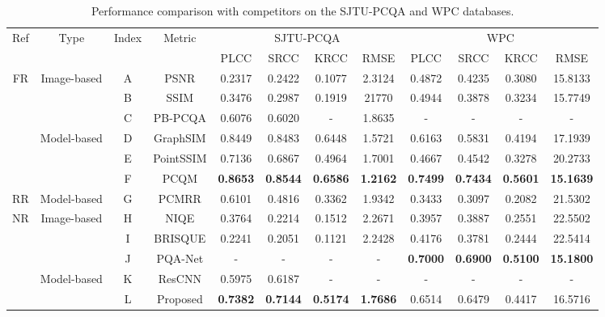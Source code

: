 \documentclass[lettersize,journal]{IEEEtran}
\begin{document}
\begin{table*}[t]
\renewcommand\arraystretch{1.4}
\renewcommand\tabcolsep{8pt}
\setlength{\abovecaptionskip}{-5pt}
  \caption{ Performance comparison with competitors on the SJTU-PCQA and WPC databases.}
  \vspace{-0.05cm}
  \begin{center}
  \begin{tabular}{c|c|c|c|cccc|cccc}
    \toprule
    \multirow{2}{*}{Ref} & \multirow{2}{*}{Type} &\multirow{2}{*}{Index} & \multirow{2}{*}{Metric} & \multicolumn{4}{c|}{SJTU-PCQA} & \multicolumn{4}{c}{WPC} \\ \cline{5-12}
     &&&& PLCC &  SRCC & KRCC & RMSE & PLCC &  SRCC & KRCC & RMSE \\
    \hline
    \multirow{6}{*}{FR} & \multirow{3}{*}{Image-based}
    &A&PSNR  & 0.2317 & 0.2422 & 0.1077 & 2.3124 & 0.4872 & 0.4235 & 0.3080 & 15.8133\\
&&B&SSIM  & 0.3476 & 0.2987 & 0.1919  & 21770 & 0.4944 & 0.3878 &0.3234 & 15.7749 \\
&&C &PB-PCQA  &0.6076 & 0.6020 & - & 1.8635  &-&-&-&- \\
    \cline{2-12}
    & \multirow{3}{*}{Model-based}
    &D&GraphSIM  &0.8449 & 0.8483 & 0.6448 & 1.5721 &0.6163 & 0.5831 & 0.4194 & 17.1939\\
&&E &PointSSIM  &0.7136 & 0.6867 & 0.4964  & 1.7001 &0.4667 & 0.4542 & 0.3278  & 20.2733\\
&&F &PCQM  &\textbf{0.8653} & \textbf{0.8544} & \textbf{0.6586}  & \textbf{1.2162} & \textbf{0.7499} & \textbf{0.7434} & \textbf{0.5601}  & \textbf{15.1639}\\
    \hline
    \multirow{1}{*}{RR} & \multirow{1}{*}{Model-based}
     &G&PCMRR  &0.6101 & 0.4816 & 0.3362  & 1.9342 &0.3433 & 0.3097 & 0.2082  & 21.5302\\
     \hline
    \multirow{5}{*}{NR} & \multirow{2}{*}{Image-based}
    &H&NIQE  &0.3764 & 0.2214 &0.1512  & 2.2671 &0.3957 &0.3887 &0.2551  & 22.5502\\


    & &I&BRISQUE  &0.2241 & 0.2051 & 0.1121 & 2.2428 &0.4176 & 0.3781 & 0.2444 & 22.5414\\
    & &J&PQA-Net  &-&-&-&- & \textbf{0.7000} & \textbf{0.6900} & \textbf{0.5100}  & \textbf{15.1800}\\
    \cline{2-12} & \multirow{2}{*}{Model-based}
    &K&ResCNN   & 0.5975 & 0.6187 & - & - &-&-&-&- \\
    & &L&Proposed  & \textbf{0.7382} & \textbf{0.7144} & \textbf{0.5174} & \textbf{1.7686} & 0.6514 & 0.6479 & 0.4417 & 16.5716\\
    \bottomrule
  \end{tabular}
  \end{center}
  \label{tab:pcqa}
  \vspace{-0.7cm}
\end{table*}
\end{document}
